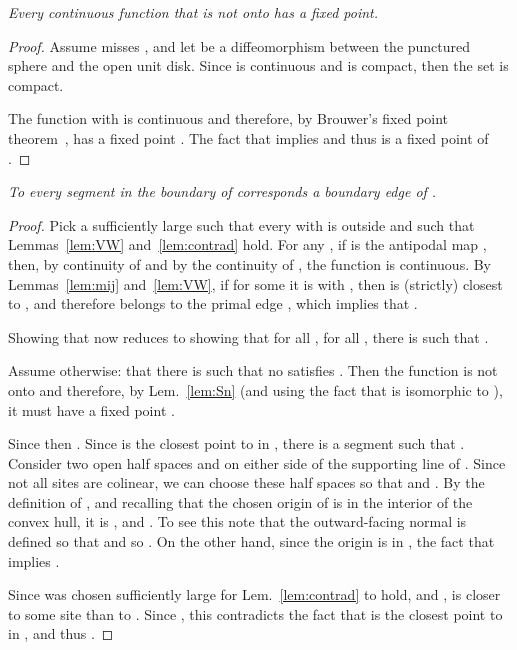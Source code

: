 \documentclass[11pt]{article}
\begin{document}
\emph{
	Every continuous function  that is not onto has a fixed point. 
}
\begin{proof}
	Assume  misses , and let
 be a diffeomorphism
between the punctured sphere and the open unit disk. 
Since  is continuous and  is compact,
then the set  is compact.

The function  with  
is continuous and therefore, by Brouwer's fixed point theorem~\cite{Milnor}, has a fixed point . 
The fact that  implies  
and thus  is a fixed point of . 
\end{proof}




\emph{
To every segment  in the boundary of
 corresponds a boundary edge of .  \emph{}
}
\begin{proof}  
Pick a sufficiently large  such that every  with
 is outside  and such that Lemmas~\ref{lem:VW} and~\ref{lem:contrad} hold. 
For any , if  is the antipodal map , 
then, by continuity of  and by the continuity of , the function  is
continuous. 
By Lemmas~\ref{lem:mij} and~\ref{lem:VW}, if for some  it is 
 with
, then  is (strictly) closest to
, and therefore belongs to the primal edge , which implies
that . 

Showing that  now reduces to showing that for all 
, for all , there is  such that
. 

Assume otherwise: that there is  such that no  satisfies . Then the function 
 is not onto and therefore, 
by Lem.~\ref{lem:Sn} (and using the fact that  is isomorphic to ), 
it must have a fixed point . 

Since  then . 
Since  is the closest point to  in , 
	there is a segment  such that
. Consider two open half spaces
 and  on either side of the supporting line of
. Since not all sites are colinear, we can choose these half spaces so that 
 and . 
By the definition of , and recalling that the chosen origin of
 is in the interior  of the convex hull, 
it is , and . 
To see this note that the outward-facing normal  is defined so that
 and so .
On the other hand, since the origin is in
, the fact that  
implies . 

Since  was chosen sufficiently large for Lem.~\ref{lem:contrad} to
hold, and ,  is closer to some site  than to . 
Since , this contradicts the fact
that  is the closest point to  in
, and thus .
\end{proof}
\end{document}
